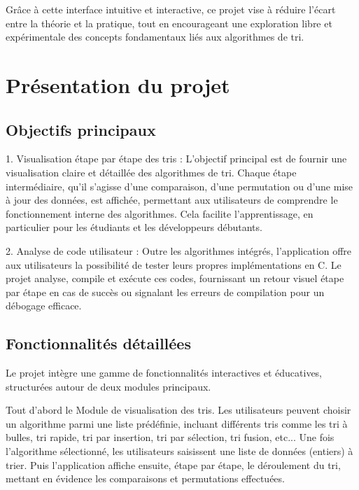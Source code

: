 \documentclass[a4paper, 12pt, twoside]{article}
\begin{document}
Grâce à cette interface intuitive et interactive, ce projet vise à réduire l’écart entre la théorie et la pratique, tout en encourageant une exploration libre et expérimentale des concepts fondamentaux liés aux algorithmes de tri.
\begin{center}
\end{center}

\newpage

\section{Présentation du projet}
\vspace{40pt}
\subsection{Objectifs principaux}
1. Visualisation étape par étape des tris : L’objectif principal est de fournir une visualisation claire et détaillée des algorithmes de tri. Chaque étape intermédiaire, qu’il s’agisse d’une comparaison, d’une permutation ou d’une mise à jour des données, est affichée, permettant aux utilisateurs de comprendre le fonctionnement interne des algorithmes. Cela facilite l’apprentissage, en particulier pour les étudiants et les développeurs débutants.
\newline

2. Analyse de code utilisateur : Outre les algorithmes intégrés, l’application offre aux utilisateurs la possibilité de tester leurs propres implémentations en C. Le projet analyse, compile et exécute ces codes, fournissant un retour visuel étape par étape en cas de succès ou signalant les erreurs de compilation pour un débogage efficace.
\vspace{30pt}
\subsection{Fonctionnalités détaillées}
Le projet intègre une gamme de fonctionnalités interactives et éducatives, structurées autour de deux modules principaux.
\newline

Tout d'abord le Module de visualisation des tris. 
Les utilisateurs peuvent choisir un algorithme parmi une liste prédéfinie, incluant différents tris comme les tri à bulles, tri rapide, tri par insertion, tri par sélection, tri fusion, etc...
Une fois l’algorithme sélectionné, les utilisateurs saisissent une liste de données (entiers) à trier.
Puis l’application affiche ensuite, étape par étape, le déroulement du tri, mettant en évidence les comparaisons et permutations effectuées.
\newline
\end{document}
